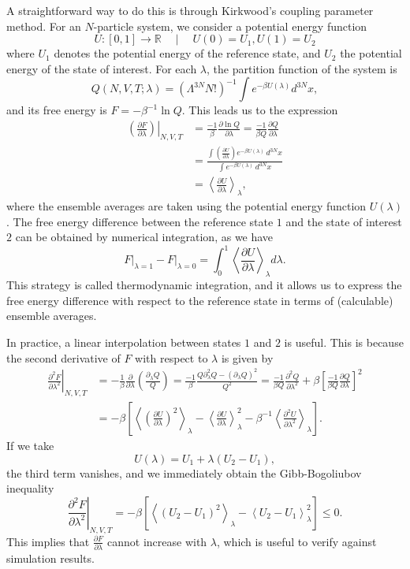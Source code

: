 \documentclass[]{article}
\begin{document}
A straightforward way to do this is through Kirkwood's coupling parameter method. 
For an $N$-particle system, we consider a potential energy function
\[
	U:[0,1]\rightarrow \mathbb{R}\quad\mid\quad U(0)=U_{1}, U(1)=U_{2}
\]
where $U_1$ denotes the potential energy of the reference state, and $U_2$ the potential energy of the state of interest.
For each $\lambda$, the partition function of the system is
\[
	Q(N,V,T;\lambda) = (\Lambda^{3N}N!)^{-1}\int e^{-\beta U(\lambda)}d^{3N}x,
\]
and its free energy is $F=-\beta^{-1}\ln Q$. 
This leads us to the expression
\[
	\begin{split}
		\left.\left( \frac{\partial F}{\partial\lambda} \right)\right\rvert_{N,V,T} 
			&= \frac{-1}{\beta}\frac{\partial \ln Q}{\partial\lambda} = \frac{-1}{\beta Q}\frac{\partial Q}{\partial \lambda} \\
			&= \frac{\int\left(\frac{\partial U}{\partial \lambda}\right)e^{-\beta U(\lambda)}\,d^{3N}x}{\int e^{-\beta U(\lambda)}\,d^{3N}x} \\
			&= \left\langle\frac{\partial U}{\partial \lambda}\right\rangle_{\lambda},
	\end{split}
\]
where the ensemble averages are taken using the potential energy function $U(\lambda)$. 
The free energy difference between the reference state $1$ and the state of interest $2$ can be obtained by numerical integration, as we have
\[
	F\rvert_{\lambda=1}-F\rvert_{\lambda=0}=\int_{0}^{1}\left\langle\frac{\partial U}{\partial \lambda}\right\rangle_{\lambda}d\lambda.
\]
This strategy is called thermodynamic integration, and it allows us to express the free energy difference with respect to the reference state in terms of (calculable) ensemble averages.

In practice, a linear interpolation between states $1$ and $2$ is useful. 
This is because the second derivative of $F$ with respect to $\lambda$ is given by
\[
	\begin{split}
		\left.\frac{\partial^2 F}{\partial \lambda^2}\right\rvert_{N,V,T}
			&= -\frac{1}{\beta}\frac{\partial}{\partial\lambda}\left(\frac{\partial_{\lambda}Q}{Q}\right) 
				= \frac{-1}{\beta}\frac{Q\partial^{2}_\lambda Q - (\partial_{\lambda}Q)^2}{Q^2} 
				= \frac{-1}{\beta Q}\frac{\partial^2 Q}{\partial \lambda^2} + \beta\left[\frac{-1}{\beta Q}\frac{\partial Q}{\partial \lambda}\right]^2\\
			&= -\beta\left[ \left\langle\left(\frac{\partial U}{\partial \lambda}\right)^2\right\rangle_{\lambda} 
				- \left\langle\frac{\partial U}{\partial \lambda}\right\rangle^{2}_{\lambda} 
				- \beta^{-1} \left\langle\frac{\partial^2 U}{\partial \lambda^2}\right\rangle_{\lambda}\right].
	\end{split}
\]
If we take 
\[
	U(\lambda) = U_{1} + \lambda(U_{2}-U_{1}),
\]
the third term vanishes, and we immediately obtain the Gibb-Bogoliubov inequality
\[
	\left.\frac{\partial^2 F}{\partial \lambda^2}\right\rvert_{N,V,T} = -\beta\left[\left\langle(U_2-U_1)^2\right\rangle_{\lambda}-\left\langle U_2-U_1 \right\rangle^{2}_{\lambda}\right]\leq 0.
\]
This implies that $\frac{\partial F}{\partial \lambda}$ cannot increase with $\lambda$, which is useful to verify against simulation results.
\end{document}
